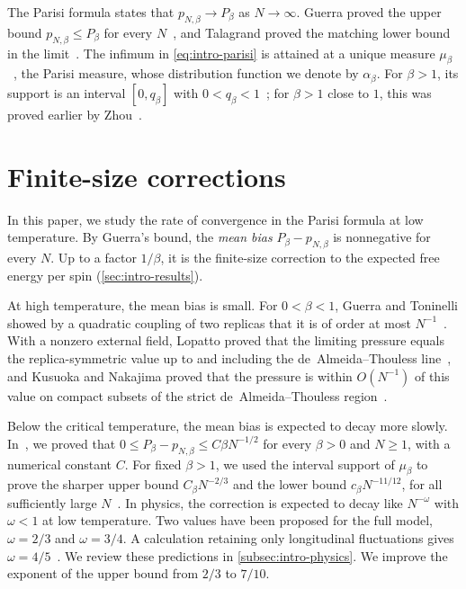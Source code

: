 The Parisi formula states that $p_{N,\beta}\to P_\beta$ as
$N\to\infty$. Guerra proved the upper bound $p_{N,\beta}\le P_\beta$ for
every $N$~\cite{Guerra2003}, and Talagrand proved the matching lower
bound in the limit~\cite{Talagrand}. The infimum in
\eqref{eq:intro-parisi} is attained at a unique measure
$\mu_\beta$~\cite{AuffingerChen2015Uniqueness}, the Parisi measure,
whose distribution function we denote by $\alpha_\beta$. For $\beta>1$,
its support is an interval $[0,q_\beta]$ with
$0<q_\beta<1$~\cite[Theorem~1.1]{Lopatto}; for $\beta>1$ close to $1$,
this was proved earlier by Zhou~\cite{Zhou2026FRSB}.

\section{Finite-size corrections}\label{sec:intro-finite-size}

In this paper, we study the rate of convergence in the Parisi formula at
low temperature. By Guerra's bound, the \emph{mean bias}
$P_\beta-p_{N,\beta}$ is nonnegative for every $N$. Up to a factor
$1/\beta$, it is the finite-size correction to the expected free energy
per spin (\cref{sec:intro-results}).

At high temperature, the mean bias is small. For $0<\beta<1$, Guerra
and Toninelli showed by a quadratic coupling of two replicas that it is
of order at most $N^{-1}$~\cite[Section~3]{GuerraToninelli2002Quadratic}.
With a nonzero external field, Lopatto proved that the limiting
pressure equals the replica-symmetric value up to and including the
de~Almeida--Thouless line~\cite[Theorem~1.1]{Lopatto2026ATLine}, and
Kusuoka and Nakajima proved that the pressure is within $O(N^{-1})$ of
this value on compact subsets of the strict de~Almeida--Thouless
region~\cite[Theorem~1.1]{KusuokaNakajima2026}.

Below the critical temperature, the mean bias is expected to decay more
slowly. In~\cite[Theorem~1.1, (1.5)]{AL}, we proved that
$0\le P_\beta-p_{N,\beta}\le C\beta N^{-1/2}$ for every $\beta>0$ and
$N\ge1$, with a numerical constant $C$. For fixed $\beta>1$, we used
the interval support of $\mu_\beta$ to prove the sharper upper bound
$C_\beta N^{-2/3}$ and the lower bound $c_\beta N^{-11/12}$, for all
sufficiently large $N$~\cite[Theorem~1.4]{AL}. In physics, the
correction is expected to decay like $N^{-\omega}$ with $\omega<1$ at
low temperature. Two values have been proposed for the full model,
$\omega=2/3$ and $\omega=3/4$. A calculation retaining only
longitudinal fluctuations gives
$\omega=4/5$~\cite{ParisiSarraTalamanca2019}. We review these predictions in
\cref{subsec:intro-physics}. We improve the exponent of the upper bound
from $2/3$ to $7/10$.

